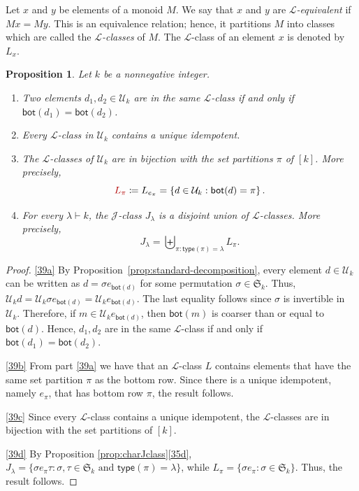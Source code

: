 \documentclass[10pt]{amsart}
\newtheorem{prop}[theorem]{Proposition}
\theoremstyle{definition}
\theoremstyle{remark}
\newcommand{\defncolor}{\color{darkred}}
\newcommand{\defn}[1]{{\defncolor\emph{#1}}} %
\begin{document}
Let $x$ and $y$ be elements of a monoid $M$.  We say that $x$ and $y$ are \defn{$\mathscr{L}$-equivalent} if $Mx = My$.
This is an equivalence relation; hence, it partitions $M$ into classes which are called the \defn{$\mathscr{L}$-classes} of $M$.
The $\mathscr{L}$-class of an element $x$ is denoted by \defn{$L_x$}.

\begin{prop} Let $k$ be a nonnegative integer.
\begin{enumerate}[label=(\alph*)]
    \item\label{39a} Two elements $d_1,d_2\in \mathcal{U}_k$ are in the same $\mathscr{L}$-class if and only if $\mathsf{bot}(d_1) = \mathsf{bot}(d_2)$.
    \item\label{39b} Every $\mathscr{L}$-class in $\mathcal{U}_k$ contains a unique idempotent.
    \item\label{39c} The $\mathscr{L}$-classes of $\mathcal{U}_k$ are in bijection with the set partitions $\pi$ of $[k]$. More precisely,
    $${\defncolor L_\pi} \coloneqq L_{e_\pi} = \left\{ d \in \mathcal{U}_k : \mathsf{bot}(d) = \pi\right\}.$$
    \item\label{39d} For every $\lambda \vdash k$, the $\mathscr{J}$-class $J_\lambda$
        is a disjoint union of $\mathscr{L}$-classes.
        More precisely, $$J_\lambda = \biguplus_{\pi: \mathsf{type}(\pi) = \lambda} L_\pi.$$
\end{enumerate}
\end{prop}

\begin{proof}
\ref{39a} By Proposition~\ref{prop:standard-decomposition}, every element $d \in \mathcal{U}_k$ can be written as
$d = \sigma e_{\mathsf{bot}(d)}$ for some permutation $\sigma \in \mathfrak{S}_k$. Thus,
$\mathcal{U}_k d = \mathcal{U}_k \sigma e_{\mathsf{bot}(d)} = \mathcal{U}_k e_{\mathsf{bot}(d)}$. The last equality follows since $\sigma$
is invertible in $\mathcal{U}_k$. Therefore, if $m \in \mathcal{U}_k e_{\mathsf{bot}(d)}$, then $\mathsf{bot}(m)$ is coarser than or equal to
$\mathsf{bot}(d)$. Hence, $d_1,d_2$ are in the same $\mathscr{L}$-class if and only if $\mathsf{bot}(d_1)= \mathsf{bot}(d_2)$.

\ref{39b} From part \ref{39a} we have that an $\mathscr{L}$-class $L$ contains elements that have the same set partition $\pi$ as the bottom row. Since there is a
unique idempotent, namely $e_\pi$, that has bottom row $\pi$, the result follows.

\ref{39c} Since every $\mathscr{L}$-class contains a unique idempotent, the $\mathscr{L}$-classes are in bijection with the set partitions of $[k]$.

\ref{39d} By Proposition \ref{prop:charJclass}\ref{35d},  $J_\lambda =\{ \sigma e_\pi \tau : \sigma, \tau \in \mathfrak{S}_k \text{ and } \mathsf{type}(\pi) = \lambda\}$, while
$L_\pi = \{\sigma e_\pi : \sigma \in \mathfrak{S}_k \}$. Thus, the result follows.
\end{proof}
\end{document}

